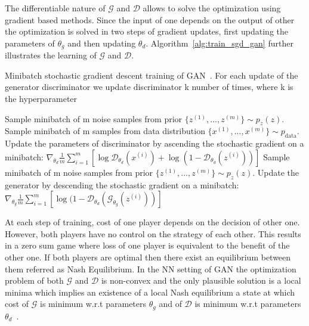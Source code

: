 The differentiable nature of $\mathcal{G}$ and $\mathcal{D}$ allows to solve the optimization using gradient based methods. Since the input of one depends on the output of other the optimization is solved in two steps of gradient updates, first updating the parameters of $\theta_g$ and then updating $\theta_d$. Algorithm~\ref{alg:train_sgd_gan} further illustrates the learning of $\mathcal{G}$ and $\mathcal{D}$.

\begin{algorithm}
    \caption{Minibatch stochastic gradient descent training of GAN~\cite{goodfellow2014generative}. For each update of the generator discriminator we update discriminator k number of times, where k is the hyperparameter}
    \label{alg:train_sgd_gan}
    \begin{algorithmic}
            \State Sample minibatch of m noise samples from prior $\{z^{(1)},..., z^{(m)}\}\sim p_z(z)$.
            \State Sample minibatch of m samples from data distribution $\{x^{(1)},...,x^{(m)}\} \sim p_\text{data}$.
            \State Update the parameters of discriminator by ascending the stochastic gradient on a minibatch:
            \State $\nabla_{\theta_d} \frac{1}{m} \sum_{i=1}^m [\log \mathcal{D}_{\theta_d}(x^{(i)}) 
             + \log (1 - \mathcal{D}_{\theta_d}(z^{(i)}) )]$
        \EndFor
        \State Sample minibatch of m noise samples from prior $\{z^{(1)},..., z^{(m)}\}\sim p_z(z)$.
        \State Update the generator by descending the stochastic gradient on a minibatch:
        \State $\nabla_{\theta_g} \frac{1}{m}  \sum_{i=1}^m [ \log (1 - \mathcal{D}_{\theta_d}(\mathcal{G}_{\theta_g}(z^{(i)}) )]$
        \EndFor
    \end{algorithmic}
\end{algorithm}

At each step of training, cost of one player depends on the decision of other one. However, both players have no control on the strategy of each other. This results in a zero sum game where loss of one player is equivalent to the benefit of the other one. If both players are optimal then there exist an equilibrium between them referred as Nash Equilibrium. In the NN setting of GAN the optimization problem of both $\mathcal{G}$ and $\mathcal{D}$ is non-convex and the only plausible solution is a local minima which implies an existence of a local Nash equilibrium a state at which cost of $\mathcal{G}$ is minimum w.r.t parameters $\theta_g$ and of $\mathcal{D}$ is minimum w.r.t parameters $\theta_d$~\cite{}.


